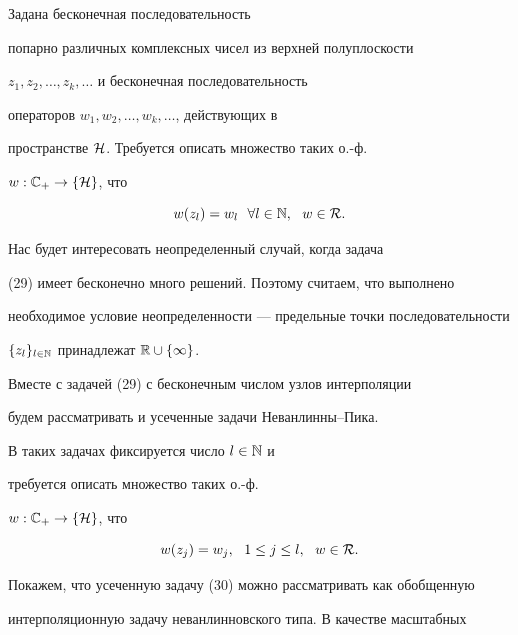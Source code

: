 \begin{exam}


 Задана бесконечная последовательность


попарно различных комплексных чисел из верхней полуплоскости


$z_1,z_2,\dotsc,z_{k},\dotsc$ и бесконечная последовательность


операторов $w_1,w_2,\dotsc,w_{k},\dotsc$, действующих в


пространстве $\cal H $. Требуется описать множество таких о.-ф.


$w:{\Bbb C}_+\to \{{\cal H }\}$, что


\begin{equation}


w(z_l)=w_l\ \ \forall l \in {\Bbb N},\ \ w\in {\cal R}.


\end{equation}





Нас будет интересовать неопределенный случай, когда задача


(29) имеет бесконечно много решений. Поэтому считаем, что выполнено


необходимое условие неопределенности --- предельные точки последовательности


$\{z_l\}_{l\in {\Bbb N}}$ принадлежат ${\Bbb R} \cup \{ \infty \}$.





Вместе с задачей (29) с бесконечным числом узлов интерполяции


будем рассматривать и усеченные задачи Неванлинны--Пика.


В таких задачах фиксируется число $l\in \Bbb N $ и


требуется описать множество таких о.-ф.


$w:{\Bbb C}_+\to \{{\cal H }\}$, что


\begin{equation}


w(z_j)=w_j,\ \ 1 \leq j \leq l,\ \ w\in {\cal R}.


\end{equation}





Покажем, что усеченную задачу (30) можно рассматривать как обобщенную


интерполяционную задачу неванлинновского типа. В качестве масштабных



\end{exam}
